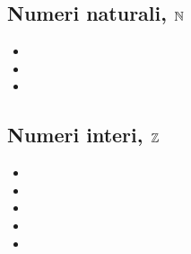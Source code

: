 \documentclass[letterpaper,10pt,italian]{jupyterBook}
\begin{document}
\subsection{Numeri naturali, \protect\(\mathbb{N}\protect\)}
\label{\detokenize{ch/set:numeri-naturali-mathbb-n}}\label{\detokenize{ch/set:math-hs-set-numbers-n}}\begin{itemize}
\item {} 
\sphinxAtStartPar
{}

\item {} 
\sphinxAtStartPar
{}

\item {} 
\sphinxAtStartPar
{}

\end{itemize}


\subsection{Numeri interi, \protect\(\mathbb{Z}\protect\)}
\label{\detokenize{ch/set:numeri-interi-mathbb-z}}\label{\detokenize{ch/set:math-hs-set-numbers-z}}\begin{itemize}
\item {} 
\sphinxAtStartPar
{}

\item {} 
\sphinxAtStartPar
{}

\item {} 
\sphinxAtStartPar
{}

\item {} 
\sphinxAtStartPar
{}

\item {} 
\sphinxAtStartPar
{}

\end{itemize}
\end{document}
